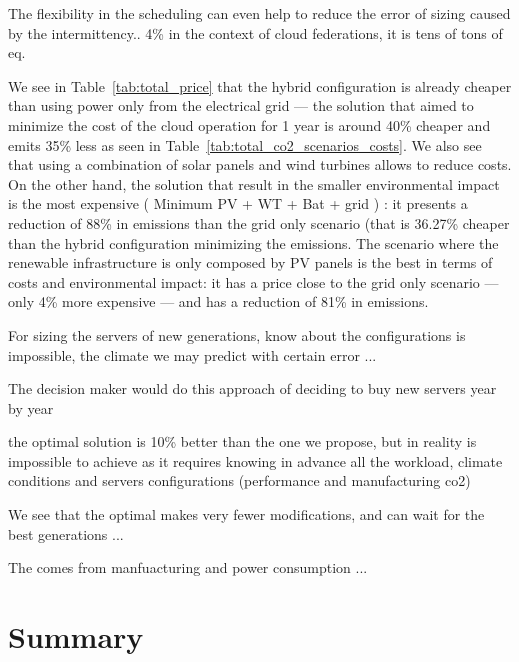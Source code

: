 The flexibility in the scheduling can even help to reduce the error of sizing caused by the intermittency.. 4\% in the context of cloud federations, it is tens of tons of  eq.



We see in Table~\ref {tab:total_price} that the hybrid configuration is already cheaper than using power only from the electrical grid --- the solution that aimed to minimize the cost of the cloud operation for 1 year is around 40\% cheaper and emits 35\% less  as seen in Table~\ref{tab:total_co2_scenarios_costs}. We also see that using a combination of solar panels and wind turbines allows to reduce costs. On the other hand, the solution that result in the smaller environmental impact is the most expensive ( Minimum  PV + WT + Bat + grid ) : it presents a reduction of 88\% in  emissions than the grid only scenario (that is 36.27\% cheaper than the hybrid configuration minimizing the emissions. The scenario where the renewable infrastructure is only composed by PV panels is the best in terms of costs and environmental impact: it has a price close to the grid only scenario --- only 4\% more expensive --- and has a reduction of 81\% in  emissions.


For sizing the servers of new generations, know about the configurations is impossible, the climate we may predict with certain error ...

The decision maker would do this approach of deciding to buy new servers year by year

the optimal solution is 10\% better than the one we propose, but in reality is impossible to achieve as it requires knowing in advance all the workload, climate conditions and servers configurations (performance and manufacturing co2)

We see that the optimal makes very fewer modifications, and can wait for the best generations ...

The  comes from manfuacturing and power consumption ...


\section{Summary}

